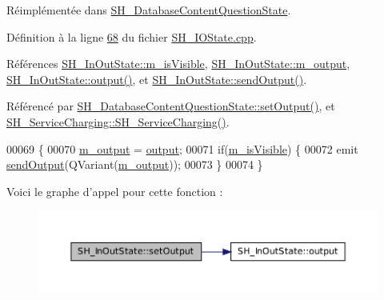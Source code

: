 Réimplémentée dans \hyperlink{classSH__DatabaseContentQuestionState_aff932cdd7974baeea9a477cf0abc5ace}{S\-H\-\_\-\-Database\-Content\-Question\-State}.



Définition à la ligne \hyperlink{SH__IOState_8cpp_source_l00068}{68} du fichier \hyperlink{SH__IOState_8cpp_source}{S\-H\-\_\-\-I\-O\-State.\-cpp}.



Références \hyperlink{classSH__InOutState_a8fd66b185c9a55f0e84daa97e2acf53a}{S\-H\-\_\-\-In\-Out\-State\-::m\-\_\-is\-Visible}, \hyperlink{classSH__InOutState_ae735e741ce229d2600448d8daa0abc2d}{S\-H\-\_\-\-In\-Out\-State\-::m\-\_\-output}, \hyperlink{classSH__InOutState_a1a2fd4f34484125058e20730aaee7e46}{S\-H\-\_\-\-In\-Out\-State\-::output()}, et \hyperlink{classSH__InOutState_ad40e929a5537eb1d4883d5aa6eee5b15}{S\-H\-\_\-\-In\-Out\-State\-::send\-Output()}.



Référencé par \hyperlink{classSH__DatabaseContentQuestionState_aff932cdd7974baeea9a477cf0abc5ace}{S\-H\-\_\-\-Database\-Content\-Question\-State\-::set\-Output()}, et \hyperlink{classSH__ServiceCharging_afa5273d046049b1c2b020a6a19a8290b}{S\-H\-\_\-\-Service\-Charging\-::\-S\-H\-\_\-\-Service\-Charging()}.


\begin{DoxyCode}
00069 \{
00070     \hyperlink{classSH__InOutState_ae735e741ce229d2600448d8daa0abc2d}{m\_output} = \hyperlink{classSH__InOutState_a1a2fd4f34484125058e20730aaee7e46}{output};
00071     \textcolor{keywordflow}{if}(\hyperlink{classSH__InOutState_a8fd66b185c9a55f0e84daa97e2acf53a}{m\_isVisible}) \{
00072         emit \hyperlink{classSH__InOutState_ad40e929a5537eb1d4883d5aa6eee5b15}{sendOutput}(QVariant(\hyperlink{classSH__InOutState_ae735e741ce229d2600448d8daa0abc2d}{m\_output}));
00073     \}
00074 \}
\end{DoxyCode}


Voici le graphe d'appel pour cette fonction \-:\nopagebreak
\begin{figure}[H]
\begin{center}
\leavevmode
\includegraphics[width=350pt]{classSH__InOutState_a7dc244d72e09fdbc30eb3a704b05a4d8_cgraph}
\end{center}
\end{figure}




